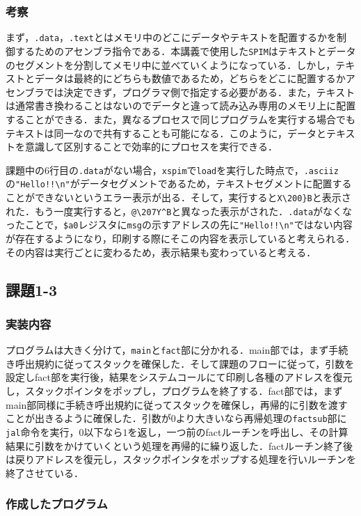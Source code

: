 \documentclass[a4j,11pt]{jarticle}
\begin{document}
  \subsubsection{考察}
  まず，\verb|.data|，\verb|.text|とはメモリ中のどこにデータやテキストを配置するかを制御するためのアセンブラ指令である．本講義で使用した\verb|SPIM|はテキストとデータのセグメントを分割してメモリ中に並べていくようになっている．しかし，テキストとデータは最終的にどちらも数値であるため，どちらをどこに配置するかアセンブラでは決定できず，プログラマ側で指定する必要がある．また，テキストは通常書き換わることはないのでデータと違って読み込み専用のメモリ上に配置することができる．また，異なるプロセスで同じプログラムを実行する場合でもテキストは同一なので共有することも可能になる．このように，データとテキストを意識して区別することで効率的にプロセスを実行できる．

  課題中の6行目の\verb|.data|がない場合，\verb|xspim|で\verb|load|を実行した時点で，\verb|.asciiz|の\verb|"Hello!!\n"|がデータセグメントであるため，テキストセグメントに配置することができないというエラー表示が出る．そして，実行すると\verb|X\200}B|と表示された．もう一度実行すると，\verb|@\207Y^B|と異なった表示がされた．\verb|.data|がなくなったことで，\verb|$a0|レジスタに\verb|msg|の示すアドレスの先に\verb|"Hello!!\n"|ではない内容が存在するようになり，印刷する際にそこの内容を表示していると考えられる．その内容は実行ごとに変わるため，表示結果も変わっていると考える．
 \subsection{課題1-3}
  \subsubsection{実装内容}
  プログラムは大きく分けて，\verb|main|と\verb|fact|部に分かれる．main部では，まず手続き呼出規約に従ってスタックを確保した．そして課題のフローに従って，引数を設定しfact部を実行後，結果をシステムコールにて印刷し各種のアドレスを復元し，スタックポインタをポップし，プログラムを終了する．fact部では，まずmain部同様に手続き呼出規約に従ってスタックを確保し，再帰的に引数を渡すことが出きるように確保した．引数が$0$より大きいなら再帰処理の\verb|factsub|部に\verb|jal|命令を実行，$0$以下なら$1$を返し，一つ前のfactルーチンを呼出し、その計算結果に引数をかけていくという処理を再帰的に繰り返した．factルーチン終了後は戻りアドレスを復元し，スタックポインタをポップする処理を行いルーチンを終了させている．

  \subsubsection{作成したプログラム}
  
\end{document}
